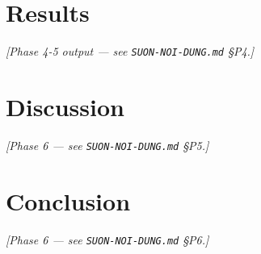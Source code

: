 \documentclass[11pt,a4paper]{article}
\begin{document}
\section{Results}\label{sec:p-results}
\textit{[Phase 4-5 output — see \texttt{SUON-NOI-DUNG.md} \S P4.]}

\section{Discussion}\label{sec:p-discussion}
\textit{[Phase 6 — see \texttt{SUON-NOI-DUNG.md} \S P5.]}

\section{Conclusion}\label{sec:p-conclusion}
\textit{[Phase 6 — see \texttt{SUON-NOI-DUNG.md} \S P6.]}

\printbibliography
\end{document}
